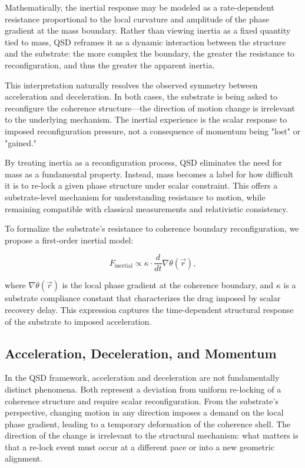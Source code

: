 \documentclass[entropy,article,submit,pdftex,moreauthors]{Definitions/mdpi}
\begin{document}
Mathematically, the inertial response may be modeled as a rate-dependent resistance proportional to the local curvature and amplitude of the phase gradient at the mass boundary. Rather than viewing inertia as a fixed quantity tied to mass, QSD reframes it as a dynamic interaction between the structure and the substrate: the more complex the boundary, the greater the resistance to reconfiguration, and thus the greater the apparent inertia.

This interpretation naturally resolves the observed symmetry between acceleration and deceleration. In both cases, the substrate is being asked to reconfigure the coherence structure---the direction of motion change is irrelevant to the underlying mechanism. The inertial experience is the scalar response to imposed reconfiguration pressure, not a consequence of momentum being "lost" or "gained."

By treating inertia as a reconfiguration process, QSD eliminates the need for mass as a fundamental property. Instead, mass becomes a label for how difficult it is to re-lock a given phase structure under scalar constraint. This offers a substrate-level mechanism for understanding resistance to motion, while remaining compatible with classical measurements and relativistic consistency.

To formalize the substrate's resistance to coherence boundary reconfiguration, we propose a first-order inertial model:

\begin{equation}
    F_{\text{inertial}} \propto \kappa \cdot \frac{d}{dt} \nabla \theta(\vec{r}),
\end{equation}

where \( \nabla \theta(\vec{r}) \) is the local phase gradient at the coherence boundary, and \( \kappa \) is a substrate compliance constant that characterizes the drag imposed by scalar recovery delay. This expression captures the time-dependent structural response of the substrate to imposed acceleration.


\subsection{Acceleration, Deceleration, and Momentum}

In the QSD framework, acceleration and deceleration are not fundamentally distinct phenomena. Both represent a deviation from uniform re-locking of a coherence structure and require scalar reconfiguration. From the substrate's perspective, changing motion in any direction imposes a demand on the local phase gradient, leading to a temporary deformation of the coherence shell. The direction of the change is irrelevant to the structural mechanism: what matters is that a re-lock event must occur at a different pace or into a new geometric alignment.
\end{document}
